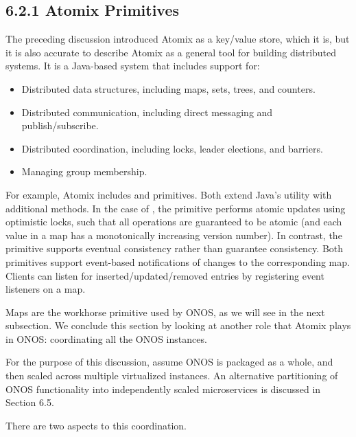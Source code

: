 \documentclass[letterpaper,11pt,english]{sphinxmanual}
\begin{document}
\subsection{6.2.1 Atomix Primitives}
\label{\detokenize{onos:atomix-primitives}}
The preceding discussion introduced Atomix as a key/value store, which
it is, but it is also accurate to describe Atomix as a general tool
for building distributed systems. It is a Java-based system that
includes support for:
\begin{itemize}
\item {} 
Distributed data structures, including maps, sets, trees, and counters.

\item {} 
Distributed communication, including direct messaging and publish/subscribe.

\item {} 
Distributed coordination, including locks, leader elections, and barriers.

\item {} 
Managing group membership.

\end{itemize}

For example, Atomix includes  and 
primitives. Both extend Java’s  utility with additional
methods. In the case of , the primitive performs atomic
updates using optimistic locks, such that all operations are
guaranteed to be atomic (and each value in a map has a monotonically
increasing version number). In contrast, the 
primitive supports eventual consistency rather than guarantee
consistency. Both primitives support event-based notifications of
changes to the corresponding map. Clients can listen for
inserted/updated/removed entries by registering event listeners on a
map.

Maps are the workhorse primitive used by ONOS, as we will see in the
next subsection. We conclude this section by looking at another role
that Atomix plays in ONOS: coordinating all the ONOS instances.%
\begin{footnote}[1]\sphinxAtStartFootnote
For the purpose of this discussion, assume ONOS is packaged as
a whole, and then scaled across multiple virtualized instances.
An alternative partitioning of ONOS functionality into
independently scaled microservices is discussed in Section 6.5.
%
\end{footnote}
There are two aspects to this coordination.
\end{document}
